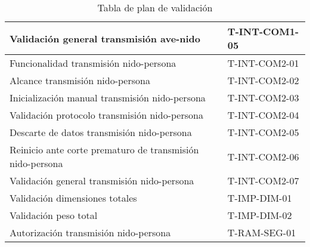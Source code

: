 \begin{table}[H]
\begin{tabular}{|l|l|}
Validación general transmisión ave-nido                              & T-INT-COM1-05                             \\ \hline
Funcionalidad transmisión nido-persona                               & T-INT-COM2-01                             \\ \hline
Alcance transmisión nido-persona                                     & T-INT-COM2-02                             \\ \hline
Inicialización manual transmisión nido-persona                       & T-INT-COM2-03                             \\ \hline
Validación protocolo transmisión nido-persona                        & T-INT-COM2-04                             \\ \hline
Descarte de datos transmisión nido-persona                           & T-INT-COM2-05                             \\ \hline
Reinicio ante corte prematuro de transmisión nido-persona            & T-INT-COM2-06                             \\ \hline
Validación general transmisión nido-persona                          & T-INT-COM2-07                             \\ \hline
Validación dimensiones totales                                       & T-IMP-DIM-01                              \\ \hline
Validación peso total                                                & T-IMP-DIM-02                              \\ \hline
Autorización transmisión nido-persona                                & T-RAM-SEG-01                              \\ \hline
\end{tabular}
\caption{Tabla de plan de validación}
\end{table}